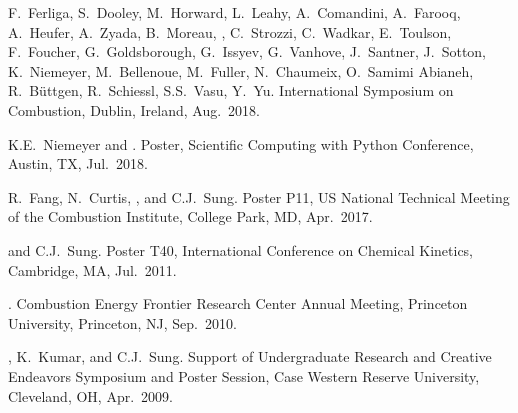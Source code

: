 \begin{bibmune}
\item F.\ Ferliga, S.\ Dooley, M.\ Horward, L.\ Leahy, A.\ Comandini,
      A.\ Farooq, A.\ Heufer, A.\ Zyada, B.\ Moreau, ,
      C.\ Strozzi, C.\ Wadkar, E.\ Toulson, F.\ Foucher, G.\ Goldsborough,
      G.\ Issyev, G.\ Vanhove, J.\ Santner, J.\ Sotton, K.\ Niemeyer, M.\ Bellenoue,
      M.\ Fuller, N.\ Chaumeix, O.\ Samimi Abianeh, R.\ Büttgen, R.\ Schiessl,
      S.S.\ Vasu, Y.\ Yu. 
       International Symposium on Combustion, Dublin, Ireland, Aug.\ 2018.

\item K.E.\ Niemeyer and .
     Poster, 
    Scientific Computing with Python Conference, Austin, TX, Jul.\ 2018.\\

\item R.\ Fang, N.\ Curtis, , and C.J.\ Sung.
       Poster
      P11,  US National Technical Meeting of the Combustion
      Institute, College Park, MD, Apr.\ 2017.

\item {} and C.J.\ Sung.  Poster T40,  International
        Conference on Chemical Kinetics, Cambridge, MA, Jul.\ 2011.\\

\item {}. 
         Combustion Energy Frontier Research Center
        Annual Meeting, Princeton University, Princeton, NJ,
        Sep.\ 2010.\\

\item {}, K.\ Kumar, and C.J.\ Sung.  Support of Undergraduate
        Research and Creative Endeavors Symposium and Poster Session,
        Case Western Reserve University, Cleveland, OH, Apr.\ 2009.\\
\end{bibmune}

